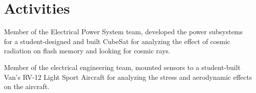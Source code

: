 \documentclass[../Gabriel_Roper_Resume]{subfiles}
\begin{document}
\section{Activities}

{}
{
    Member of the Electrical Power System team, developed the
    power subsystems for a student-designed and built
    CubeSat for analyzing the effect of cosmic radiation on
    flash memory and looking for cosmic rays.
}

{}
{
    Member of the electrical engineering team, mounted sensors
    to a student-built Van's RV-12 Light Sport Aircraft for analyzing the
    stress and aerodynamic effects on the aircraft.
}



\end{document}
